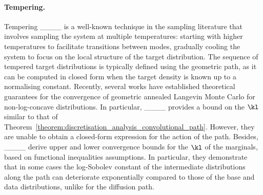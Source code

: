 \paragraph{Tempering.}
Tempering ____ is a well-known technique in the sampling literature that involves sampling the system at multiple temperatures: starting with higher temperatures to facilitate transitions between modes, gradually cooling the system to focus on the local structure of the target distribution. 
The sequence of tempered target distributions is typically defined using the geometric path, as it can be computed in closed form when the target density is known up to a normalising constant.
Recently, several works have established theoretical guarantees for the convergence of geometric annealed Langevin Monte Carlo for non-log-concave distributions. In particular, ____ provides a bound on the $\kl$  similar to that of Theorem~\ref{theorem:discretisation_analysis_convolutional_path}. However, they are unable to obtain a closed-form expression for the action of the path. 
Besides, ____ derive upper and lower convergence bounds for the $\kl$ of the marginals, based on functional inequalities assumptions. 
In particular, they demonstrate that in some cases the log-Sobolev constant of the intermediate distributions along the path can deteriorate exponentially compared to those of the base and data distributions, unlike for the diffusion path.